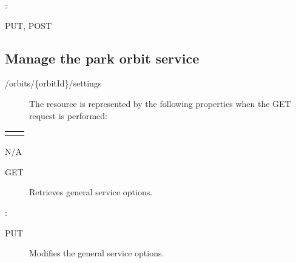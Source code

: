 \documentclass[letterpaper,10pt,english]{sphinxmanual}
\begin{document}
:

\begin{sphinxVerbatim}[commandchars=\\\{\}]
\end{sphinxVerbatim}

 PUT, POST


\subsection{Manage the park orbit service}
\label{\detokenize{restapi:manage-the-park-orbit-service}}
 /orbits/\{orbitId\}/settings
\begin{description}
\item[{}] \leavevmode
The resource is represented by the following properties when the GET request is performed:

\end{description}


\begin{savenotes}\sphinxattablestart
\centering
\begin{tabulary}{\linewidth}[t]{|T|T|}
\hline

&
\\
\hline&\\
\hline
\end{tabulary}
\par
\sphinxattableend\end{savenotes}

 N/A
\begin{description}
\item[{ GET}] \leavevmode
Retrieves general service options.

\end{description}

:

\begin{sphinxVerbatim}[commandchars=\\\{\}]
\end{sphinxVerbatim}
\begin{description}
\item[{ PUT}] \leavevmode
Modifies the general service options.

\end{description}
\end{document}
